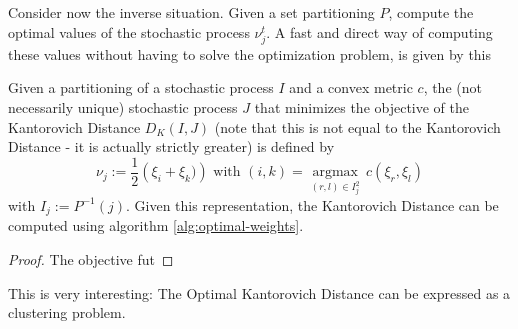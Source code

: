 Consider now the inverse situation. Given a set partitioning $P$, compute the optimal values of the stochastic process $\nu_j^t$. A fast and direct way of computing these values without having to solve the optimization problem, is given by this
\begin{thm}
  Given a partitioning of a stochastic process $I$ and a convex metric $c$, the (not necessarily unique) stochastic process $J$ that minimizes the objective of the Kantorovich Distance $D_K(I,J)$ (note that this is not equal to the Kantorovich Distance - it is actually strictly greater) is defined by
  \begin{equation}
    \nu_j := \frac{1}{2}\left(\xi_i+\xi_k)\right)\text{ with }(i,k) = \underset{(r,l)\in I_j^2}{\operatorname{argmax}}\, c(\xi_r,\xi_l)
  \end{equation}
  with $I_j:=P^{-1}(j)$. Given this representation, the Kantorovich Distance can be computed using algorithm \ref{alg:optimal-weights}. 
\end{thm}
\begin{proof}
  The objective fut
\end{proof}
\begin{Note}
  This is very interesting: The Optimal Kantorovich Distance can be expressed as a clustering problem.
\end{Note}
